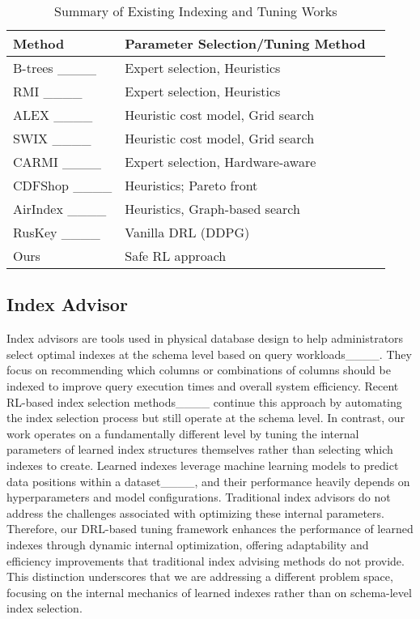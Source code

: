 \begin{table}[t]
    \centering
    \captionsetup{font=small}
    \small
    \begin{tabular}{l l p{9cm}}
        \hline
        \textbf{Method} & \textbf{Parameter Selection/Tuning Method}  \\
        \hline
        B-trees ____ & Expert selection,  Heuristics \\
        RMI ____ &  Expert selection,  Heuristics \\
        ALEX ____ & Heuristic cost model, Grid search \\
        SWIX ____ & Heuristic cost model, Grid search \\
        CARMI ____ & Expert selection, Hardware-aware \\
        CDFShop ____ & Heuristics; Pareto front \\
        AirIndex ____ & Heuristics, Graph-based search  \\
        RusKey ____ & Vanilla DRL (DDPG)  \\
        Ours & Safe RL approach\\
        \hline
    \end{tabular}
    \caption{Summary of Existing Indexing and Tuning Works}
    \label{tab:index_methods}
\end{table}

\subsection{Index Advisor}
Index advisors are tools used in physical database design to help administrators select optimal indexes at the schema level based on query workloads____. They focus on recommending which columns or combinations of columns should be indexed to improve query execution times and overall system efficiency. Recent RL-based index selection methods____ continue this approach by automating the index selection process but still operate at the schema level. In contrast, our work operates on a fundamentally different level by tuning the internal parameters of learned index structures themselves rather than selecting which indexes to create. Learned indexes leverage machine learning models to predict data positions within a dataset____, and their performance heavily depends on hyperparameters and model configurations. Traditional index advisors do not address the challenges associated with optimizing these internal parameters. Therefore, our DRL-based tuning framework enhances the performance of learned indexes through dynamic internal optimization, offering adaptability and efficiency improvements that traditional index advising methods do not provide. This distinction underscores that we are addressing a different problem space, focusing on the internal mechanics of learned indexes rather than on schema-level index selection.



%